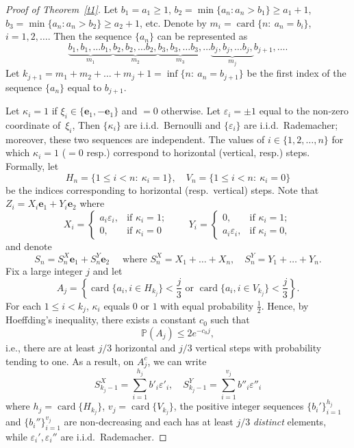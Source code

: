 \documentclass[10pt,a4paper]{amsart}
\renewcommand\P{\mathbb{P}}
\newcommand\be{\mathbf{e}}
\DeclareMathOperator{\card}{card}
\newcommand\eps{\varepsilon}
\begin{document}
\begin{proof}[Proof of Theorem~\ref{t1}]
Let $b_1=a_1\ge 1$, $b_2=\min\{a_n: a_n>b_1\}\ge a_1+1$,  $b_3=\min\{a_n: a_n>b_2\}\ge a_2+1$, etc. Denote by $m_i=\card\{n:\ a_n=b_i\}$, $i=1,2,\dots$. Then the sequence $\{a_n\}$ can be represented as
$$
\underbrace{b_1, b_1, \dots b_1,}_{m_1}
\underbrace{b_2, b_2, \dots b_2,}_{m_2} 
\underbrace{b_3, b_3, \dots b_3,}_{m_3} 
\dots
\underbrace{b_j, b_j, \dots b_j,}_{m_j}b_{j+1},\dots .
$$
Let  $k_{j+1}=m_1+m_2+\dots+m_{j}+1=\inf\{n:\ a_n=b_{j+1}\}$ be the first index of the sequence $\{a_n\}$ equal to $b_{j+1}$.

Let $\kappa_i=1$ if $\xi_i\in\{\be_1,-\be_1\}$ and $=0$ otherwise. Let $\eps_i=\pm 1$ equal to the non-zero coordinate of~$\xi_i$, Then $\{\kappa_i\}$ are i.i.d.\ Bernoulli and $\{\eps_i\}$ are i.i.d.\ Rademacher; moreover, these two sequences are independent. The values of $i\in\{1,2,\dots,n\}$ for which $\kappa_i=1$ ($=0$ resp.) correspond to horizontal (vertical, resp.) steps. Formally, let
$$
H_n=\{1\le i<n:\ \kappa_i=1\},\quad
V_n=\{1\le i< n:\ \kappa_i=0\}
$$
be the indices corresponding to horizontal (resp.\ vertical) steps. Note that $Z_i=X_i \be_1+Y_i\be_2$ where 
$$
X_i=\begin{cases}
   a_i\eps_i,&\text{if } \kappa_i=1;\\
   0, &\text{if } \kappa_i=0
\end{cases}
\qquad
Y_i=\begin{cases}
   0,&\text{if } \kappa_i=1;\\
   a_i\eps_i,&\text{if } \kappa_i=0,
\end{cases}
$$
and denote 
$$
S_n=S^X_n\be_1+S^Y_n\be_2\quad \text{ where }
S_n^X=X_1+\dots+X_n,\quad S_n^Y=Y_1+\dots+Y_n.
$$
Fix a large integer $j$ and let
$$
A_j=\left\{\card\{a_i,i\in H_{k_j}\}<\frac j3\text{ \ or \ }\card\{a_i,i\in V_{k_j}\}<\frac j3\right\}.
$$
For each $1\le i< k_j$, $\kappa_i$ equals $0$ or $1$ with equal probability $\frac12$. Hence, by Hoeffding's inequality, there exists a constant $c_0$ such that  
$$
\P(A_j)\le 2e^{-c_0 j},
$$ 
i.e., there are at least $j/3$ horizontal and $j/3$ vertical steps with probability tending to one. As a result, on $A_j^c$, we can write
$$
S^X_{k_j-1}=\sum_{i=1}^{h_j} b'_i \eps'_i, \quad S^Y_{k_j-1}=\sum_{i=1}^{v_j} b''_i \eps''_i
$$
where $h_j=\card\{H_{k_j}\}$, $v_j=\card\{V_{k_j}\}$, the positive integer sequences $\{b_i'\}_{i=1}^{h_j}$ and $\{b_i''\}_{i=1}^{v_j}$ are non-decreasing and each has at least $j/3$ {\em distinct} elements, while $\eps_i',\eps_i''$ are i.i.d.\ Rademacher.


\end{proof}
\end{document}
